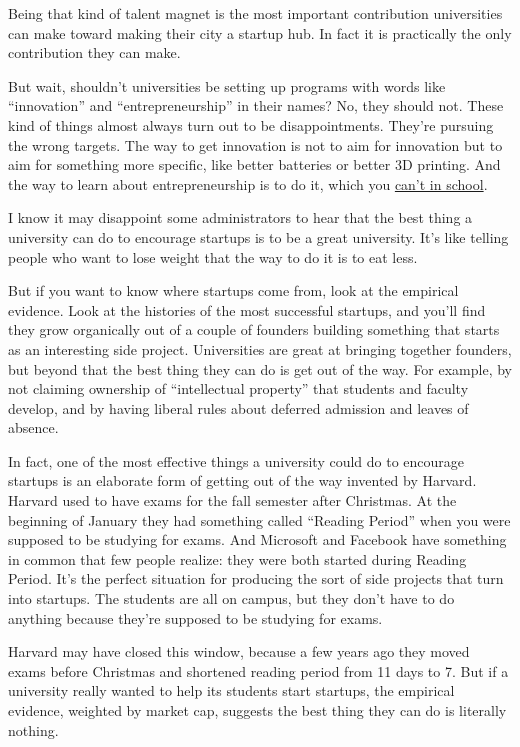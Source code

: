 Being that kind of talent magnet is the most important contribution
universities can make toward making their city a startup hub. In fact it
is practically the only contribution they can make.

But wait, shouldn't universities be setting up programs with words like
``innovation'' and ``entrepreneurship'' in their names? No, they should
not. These kind of things almost always turn out to be disappointments.
They're pursuing the wrong targets. The way to get innovation is not to
aim for innovation but to aim for something more specific, like better
batteries or better 3D printing. And the way to learn about
entrepreneurship is to do it, which you \href{before.html}{can't in
school}.

I know it may disappoint some administrators to hear that the best thing
a university can do to encourage startups is to be a great university.
It's like telling people who want to lose weight that the way to do it
is to eat less.

But if you want to know where startups come from, look at the empirical
evidence. Look at the histories of the most successful startups, and
you'll find they grow organically out of a couple of founders building
something that starts as an interesting side project. Universities are
great at bringing together founders, but beyond that the best thing they
can do is get out of the way. For example, by not claiming ownership of
``intellectual property'' that students and faculty develop, and by
having liberal rules about deferred admission and leaves of absence.

In fact, one of the most effective things a university could do to
encourage startups is an elaborate form of getting out of the way
invented by Harvard. Harvard used to have exams for the fall semester
after Christmas. At the beginning of January they had something called
``Reading Period'' when you were supposed to be studying for exams. And
Microsoft and Facebook have something in common that few people realize:
they were both started during Reading Period. It's the perfect situation
for producing the sort of side projects that turn into startups. The
students are all on campus, but they don't have to do anything because
they're supposed to be studying for exams.

Harvard may have closed this window, because a few years ago they moved
exams before Christmas and shortened reading period from 11 days to 7.
But if a university really wanted to help its students start startups,
the empirical evidence, weighted by market cap, suggests the best thing
they can do is literally nothing.

